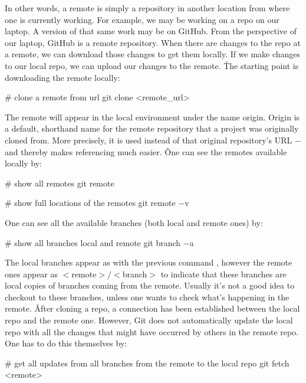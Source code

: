 In other words, a remote is simply a repository in another location from where one is currently working. For example,
we may be working on a repo on our laptop. A version of that same work may be on GitHub. From the perspective of our
laptop, GitHub is a remote repository. When there are changes to the repo at a remote, we can download those changes
to get them locally. If we make changes to our local repo, we can upload our changes to the remote. \v

The starting point is downloading the remote locally:

\begin{bash}
# clone a remote from url
git clone <remote_url>
\end{bash}

The remote will appear in the local environment under the name origin. Origin is a default, shorthand name for the
remote repository that a project was originally cloned from. More precisely, it is used instead of that original
repository's URL $-$ and thereby makes referencing much easier. \v

One can see the remotes available locally by:

\begin{bash}
# show all remotes
git remote
\end{bash}

\begin{bash}
# show full locations of the remotes
git remote $-$v
\end{bash}

One can see all the available branches (both local and remote ones) by:

\begin{bash}
# show all branches local and remote
git branch $-$a
\end{bash}

The local branches appear as with the previous command , however the remote ones appear as
$<$remote$>/<$branch$>$ to indicate that these branches are local copies of branches coming from the remote. Usually
it’s not a good idea to checkout to these branches, unless one wants to check what’s happening in the remote. \v

After cloning a repo, a connection has been established between the local repo and the remote one. However, Git does
not automatically update the local repo with all the changes that might have occurred by others in the remote repo.
One has to do this themselves by:

\begin{bash}
# get all updates from all branches from the remote to the local repo
git fetch <remote>
\end{bash}

